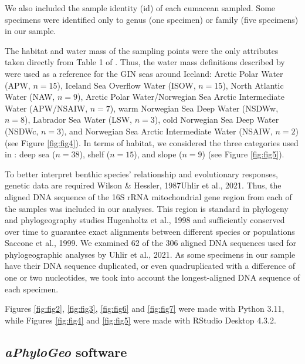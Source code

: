 We also included the sample identity (id) of each cumacean sampled. Some specimens were identified only to genus (one specimen) or family (five specimens) in our sample.
 
The habitat and water mass of the sampling points were the only attributes taken directly from Table 1 of \citep{uhlir_adding_2021}. Thus, the water mass definitions described by \citep{hansen_north_2000, brix2010distribution, ostmann_marine_2014} were used as a reference for the GIN seas around Iceland: Arctic Polar Water (APW, $n=15$), Iceland Sea Overflow Water (ISOW, $n=15$), North Atlantic Water (NAW, $n=9$), Arctic Polar Water/Norwegian Sea Arctic Intermediate Water (APW/NSAIW, $n=7$), warm Norwegian Sea Deep Water (NSDWw, $n=8$), Labrador Sea Water (LSW, $n=3$), cold Norwegian Sea Deep Water (NSDWc, $n=3$), and Norwegian Sea Arctic Intermediate Water (NSAIW, $n=2$) (see Figure \ref{fig:fig4}). In terms of habitat, we considered the three categories used in \citep{uhlir_adding_2021}: deep sea ($n=38$), shelf ($n=15$), and slope ($n=9$) (see Figure \ref{fig:fig5}).

To better interpret benthic species' relationship and evolutionary responses, genetic data are required Wilson & Hessler, 1987Uhlir et al., 2021. Thus, the aligned DNA sequence of the 16S rRNA mitochondrial gene region from each of the samples was included in our analyses. This region is standard in phylogeny and phylogeography studies Hugenholtz et al., 1998 and sufficiently conserved over time to guarantee exact alignments between different species or populations Saccone et al., 1999. We examined 62 of the 306 aligned DNA sequences used for phylogeographic analyses by Uhlir et al., 2021. As some specimens in our sample have their DNA sequence duplicated, or even quadruplicated with a difference of one or two nucleotides, we took into account the longest-aligned DNA sequence of each specimen.

Figures \ref{fig:fig2}, \ref{fig:fig3}, \ref{fig:fig6} and \ref{fig:fig7} were made with Python 3.11, while Figures \ref{fig:fig4} and \ref{fig:fig5} were made with RStudio Desktop 4.3.2.

\subsection{\textit{aPhyloGeo} software}\label{aPhyloGeo-software}

